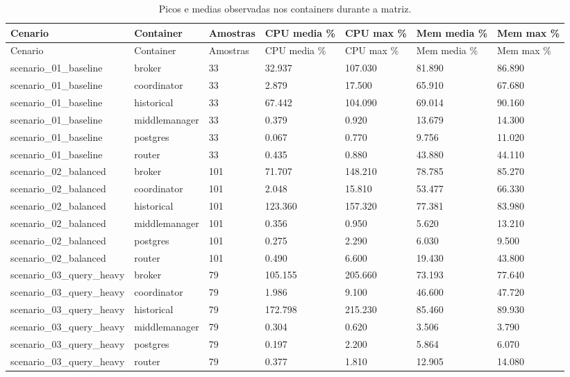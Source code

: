 {
\footnotesize
\setlength{\tabcolsep}{4pt}
\renewcommand{\arraystretch}{1.15}
\begin{longtable}{p{}p{}p{}p{}p{}p{}p{}}
\caption{Picos e medias observadas nos containers durante a matriz.}\\
\toprule
Cenario & Container & Amostras & CPU media \% & CPU max \% & Mem media \% & Mem max \% \\
\midrule
\endfirsthead
\toprule
Cenario & Container & Amostras & CPU media \% & CPU max \% & Mem media \% & Mem max \% \\
\midrule
\endhead
scenario\_01\_baseline & broker & 33 & 32.937 & 107.030 & 81.890 & 86.890 \\
scenario\_01\_baseline & coordinator & 33 & 2.879 & 17.500 & 65.910 & 67.680 \\
scenario\_01\_baseline & historical & 33 & 67.442 & 104.090 & 69.014 & 90.160 \\
scenario\_01\_baseline & middlemanager & 33 & 0.379 & 0.920 & 13.679 & 14.300 \\
scenario\_01\_baseline & postgres & 33 & 0.067 & 0.770 & 9.756 & 11.020 \\
scenario\_01\_baseline & router & 33 & 0.435 & 0.880 & 43.880 & 44.110 \\
scenario\_02\_balanced & broker & 101 & 71.707 & 148.210 & 78.785 & 85.270 \\
scenario\_02\_balanced & coordinator & 101 & 2.048 & 15.810 & 53.477 & 66.330 \\
scenario\_02\_balanced & historical & 101 & 123.360 & 157.320 & 77.381 & 83.980 \\
scenario\_02\_balanced & middlemanager & 101 & 0.356 & 0.950 & 5.620 & 13.210 \\
scenario\_02\_balanced & postgres & 101 & 0.275 & 2.290 & 6.030 & 9.500 \\
scenario\_02\_balanced & router & 101 & 0.490 & 6.600 & 19.430 & 43.800 \\
scenario\_03\_query\_heavy & broker & 79 & 105.155 & 205.660 & 73.193 & 77.640 \\
scenario\_03\_query\_heavy & coordinator & 79 & 1.986 & 9.100 & 46.600 & 47.720 \\
scenario\_03\_query\_heavy & historical & 79 & 172.798 & 215.230 & 85.460 & 89.930 \\
scenario\_03\_query\_heavy & middlemanager & 79 & 0.304 & 0.620 & 3.506 & 3.790 \\
scenario\_03\_query\_heavy & postgres & 79 & 0.197 & 2.200 & 5.864 & 6.070 \\
scenario\_03\_query\_heavy & router & 79 & 0.377 & 1.810 & 12.905 & 14.080 \\
\bottomrule
\end{longtable}
}
